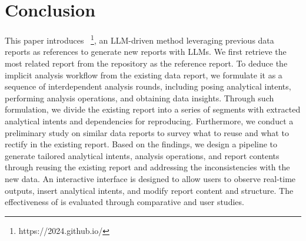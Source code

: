 \section{Conclusion}

This paper introduces \system{}~\footnote{https://\system{}2024.github.io/}, an LLM-driven method leveraging previous data reports as references to generate new reports with LLMs. 
We first retrieve the most related report from the repository as the reference report. 
To deduce the implicit analysis workflow from the existing data report, we formulate it as a sequence of interdependent analysis rounds, including posing analytical intents, performing analysis operations, and obtaining data insights. 
Through such formulation, we divide the existing report into a series of segments with extracted analytical intents and dependencies for reproducing. 
Furthermore, we conduct a preliminary study on similar data reports to survey what to reuse and what to rectify in the existing report. 
Based on the findings, we design a pipeline to generate tailored analytical intents, analysis operations, and report contents through reusing the existing report and addressing the inconsistencies with the new data. 
An interactive interface is designed to allow users to observe real-time outputs, insert analytical intents, and modify report content and structure. 
The effectiveness of \system{} is evaluated through comparative and user studies. 